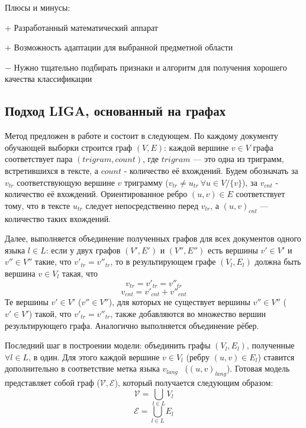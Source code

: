 \documentclass[a4paper, 14pt]{article}
\begin{document}
		\noindent Плюсы и минусы:
		
		$+$ Разработанный математический аппарат
		
		$+$ Возможность адаптации для выбранной предметной области
		
		$-$ Нужно тщательно подбирать признаки и алгоритм для получения хорошего качества классификации
		
		\subsection{Подход LIGA, основанный на графах}
		Метод предложен в работе \cite{liga} и состоит в следующем.				
		По каждому документу обучающей выборки строится граф $(V, E)$:
		 каждой вершине $v \in V$ графа соответствует пара $(trigram, count)$, где $trigram$ --- это одна
		из триграмм, встретившихся в тексте, а $count$ - количество её вхождений. Будем обозначать за $v_{tr}$ соответствующую вершине $v$ триграмму
		($v_{tr} \neq u_{tr} \ \forall u \in V/ \{v\}$), за $v_{cnt}$ - количество её вхождений. 
		Ориентированное ребро $(u, v) \in E$ соответствует тому, что в тексте $u_{tr}$ следует непосредственно
		перед $v_{tr}$, а $(u, v)_{cnt}$ --- количество таких вхождений.
		
		Далее, выполняется объединение полученных графов для всех документов одного языка $l \in L$: если у двух графов $(V', E')$ и $(V'', E'')$ есть вершины
		$v' \in V'$ и $v'' \in V''$ такие, что $v'_{tr} = v''_{tr}$, то в результирующем графе $(V_{l}, E_{l})$ должна быть вершина 
		$v \in V_{l}$ такая, что 
		$$v_{tr} = v'_{tr} = v''_{tr}$$ $$v_{cnt} = v'_{cnt} + v''_{cnt}$$
		Те вершины $v' \in V'$ ($v'' \in V''$), для которых  не существует вершины $v'' \in V''$ ($v' \in V'$) такой, что $v'_{tr} = v''_{tr}$, также добавляются во множество вершин результирующего графа.
		Аналогично выполняется объединение рёбер.
		
		Последний шаг в построении модели: объединить графы $(V_{l}, E_{l})$, полученные $\forall l \in L$, в один. 
		Для этого каждой вершине $v \in V_{l}$
		(ребру $(u, v) \in E_{l}$) ставится дополнительно в соответствие метка языка $v_{lang}$ \ ($(u, v)_{lang}$). 
		Готовая модель представляет собой граф
		($\mathcal{V}, \mathcal{E}$), который получается следующим образом:
		$$ \mathcal{V} = \bigcup_{l \in L} V_{l}$$
		$$ \mathcal{E} = \bigcup_{l \in L} E_{l}$$
		
\end{document}
